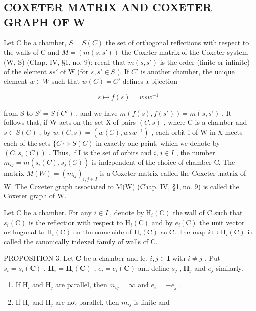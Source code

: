 \subsection{COXETER MATRIX AND COXETER GRAPH OF W}

Let C be a chamber, \(S = S(C)\) the set of orthogonal reflections with respect to the walls of C and \(M = (m(s, s'))\) the Coxeter matrix of the Coxeter system (W, S) (Chap. IV, §1, no. 9): recall that \(m(s, s')\) is the order (finite or infinite) of the element \(ss'\) of W (for \(s, s' \in S\) ). If \(C'\) is another chamber, the unique element \(w \in W\) such that \(w(C) = C'\) defines a bijection

\[
s \mapsto f (s) = w s w ^ {- 1}
\]

from S to \(S' = S(C')\) , and we have \(m(f(s), f(s')) = m(s, s')\) . It follows that, if W acts on the set X of pairs \((C, s)\) , where C is a chamber and \(s \in S(C)\) , by \(w.(C, s) = (w(C), wsw^{-1})\) , each orbit i of W in X meets each of the sets \(\{C\} \times S(C)\) in exactly one point, which we denote by \((C, s_i(C))\) . Thus, if I is the set of orbits and \(i, j \in I\) , the number \(m_{ij} = m(s_i(C), s_j(C))\) is independent of the choice of chamber C. The matrix \(M(W) = (m_{ij})_{i,j \in I}\) is a Coxeter matrix called the Coxeter matrix of W. The Coxeter graph associated to M(W) (Chap. IV, §1, no. 9) is called the Coxeter graph of W.

Let C be a chamber. For any \(i \in I\) , denote by \(\mathrm{H}_{i}(\mathrm{C})\) the wall of C such that \(s_{i}(\mathrm{C})\) is the reflection with respect to \(\mathrm{H}_{i}(\mathrm{C})\) and by \(e_{i}(\mathrm{C})\) the unit vector orthogonal to \(\mathrm{H}_{i}(\mathrm{C})\) on the same side of \(\mathrm{H}_{i}(\mathrm{C})\) as C. The map \(i \mapsto \mathrm{H}_{i}(\mathrm{C})\) is called the canonically indexed family of walls of C.

PROPOSITION 3. Let \(\mathbf{C}\) be a chamber and let \(i, j \in \mathbf{I}\) with \(i \neq j\) . Put \(s_i = s_i(\mathbf{C})\) , \(\mathbf{H}_i = \mathbf{H}_i(\mathbf{C})\) , \(e_i = e_i(\mathbf{C})\) and define \(s_j\) , \(\mathbf{H}_j\) and \(e_j\) similarly.

\begin{enumerate}
\def\labelenumi{(\roman{enumi})}
\item
  If \(\mathrm{H}_i\) and \(\mathrm{H}_j\) are parallel, then \(m_{ij} = \infty\) and \(e_i = -e_j\) .
\item
  If \(\mathrm{H}_i\) and \(\mathrm{H}_j\) are not parallel, then \(m_{ij}\) is finite and
\end{enumerate}

